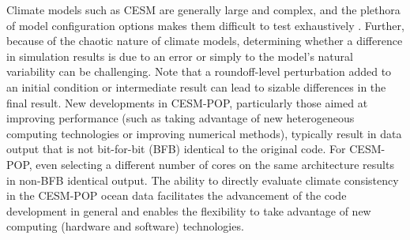 \documentclass[gmd, manuscript]{copernicus}
\begin{document}
Climate models such as CESM are generally large and complex, and the plethora of model configuration options makes them difficult to test exhaustively \citep{clune2011, pipitone2012}.  Further, because of the chaotic nature of climate models, determining whether a difference in simulation results is due to an error or simply to the model's natural variability can be challenging.  Note that a roundoff-level perturbation added to an initial condition or intermediate result can lead to sizable differences in the final result.  New developments in CESM-POP, particularly those aimed at improving performance (such as taking advantage of new heterogeneous computing technologies or improving numerical methods), typically result in data output that is not bit-for-bit (BFB) identical to the original code.  For CESM-POP, even selecting a different number of cores on the same architecture results in non-BFB identical output.
The ability to directly evaluate climate consistency in the CESM-POP ocean data facilitates the advancement of the code development in general and enables the flexibility to take advantage of new computing (hardware and software) technologies.
\end{document}
